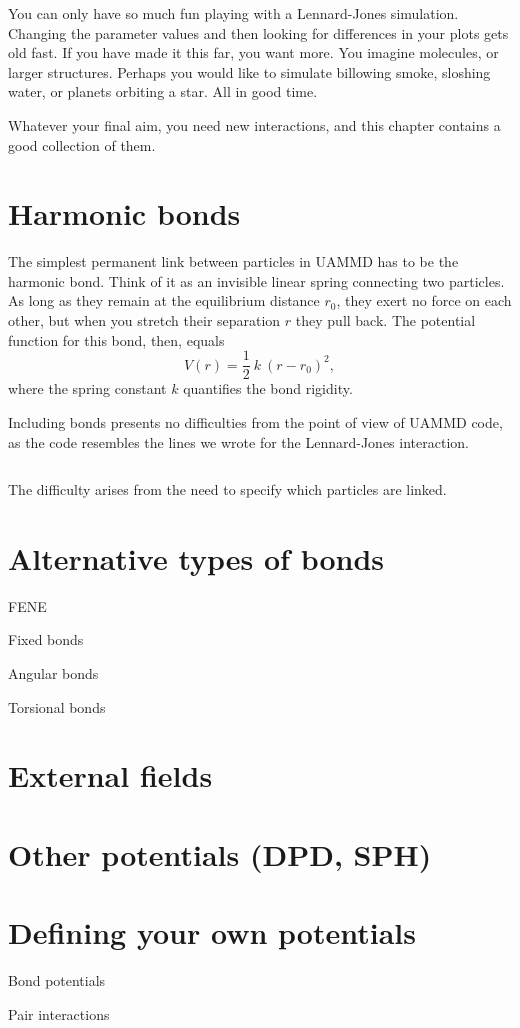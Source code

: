 You can only have so much fun playing with a Lennard-Jones simulation. Changing
the parameter values and then looking for differences in your plots gets old
fast. If you have made it this far, you want more. You imagine molecules, or
larger structures. Perhaps you would like to simulate billowing smoke, sloshing
water, or planets orbiting a star. All in good time.

Whatever your final aim, you need new interactions, and this chapter contains a
good collection of them.

\section{Harmonic bonds}

The simplest permanent link between particles in UAMMD has to be the harmonic
bond. Think of it as an invisible linear spring connecting two particles. As
long as they remain at the equilibrium distance $r_0$, they exert no force on
each other, but when you stretch their separation $r$ they pull back. The
potential function for this bond, then, equals
\begin{equation*}
  V(r) = \frac{1}{2}\ k\ (r - r_0)^2,
\end{equation*}
where the spring constant $k$ quantifies the bond rigidity.

Including bonds presents no difficulties from the point of view of UAMMD code,
as the code resembles the lines we wrote for the Lennard-Jones interaction.
\begin{lstlisting}
\end{lstlisting}
The difficulty arises from the need to specify which particles are linked.

\section{Alternative types of bonds}

FENE

Fixed bonds

Angular bonds

Torsional bonds

\section{External fields}

\section{Other potentials (DPD, SPH)}

\section{Defining your own potentials}

Bond potentials

Pair interactions
